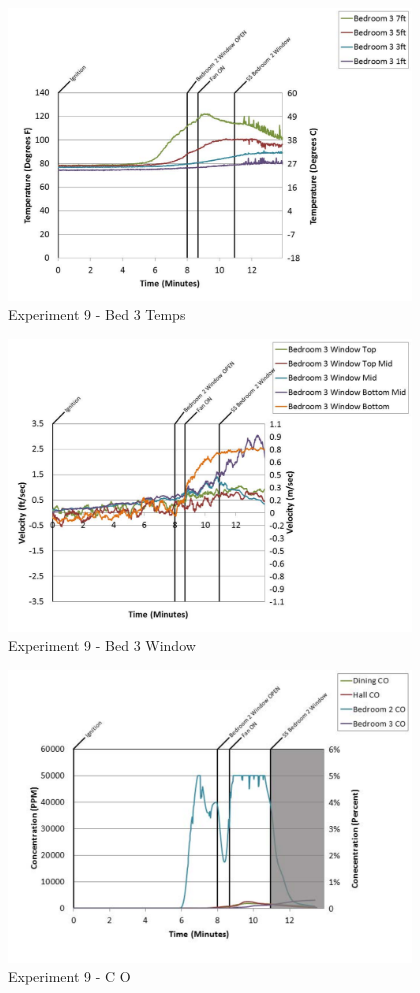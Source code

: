 \documentclass{article}
\begin{document}
\begin{appendices}
	\clearpage

	\begin{figure}[h!]
		\centering
		\includegraphics[height=3.05in]{0_Images/Results_Charts/Exp_9_Charts/Bed3Temps.pdf}
		\caption{Experiment 9 - Bed 3 Temps}
	\end{figure}
 

	\begin{figure}[h!]
		\centering
		\includegraphics[height=3.05in]{0_Images/Results_Charts/Exp_9_Charts/Bed3Window.pdf}
		\caption{Experiment 9 - Bed 3 Window}
	\end{figure}
 
	\clearpage

	\begin{figure}[h!]
		\centering
		\includegraphics[height=3.05in]{0_Images/Results_Charts/Exp_9_Charts/CO.pdf}
		\caption{Experiment 9 - C O}
	\end{figure}
 


\end{appendices}
\end{document}
